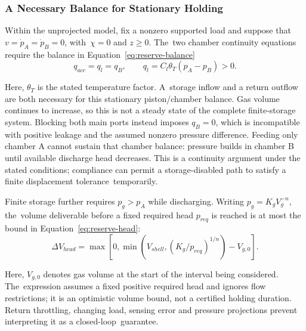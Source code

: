\documentclass[machines,article,submit,pdftex,moreauthors]{Definitions/mdpi}
\begin{document}
\subsubsection{A Necessary Balance for Stationary Holding}
Within the unprojected model, fix a nonzero supported load and suppose that $v=\dot p_A=\dot p_B=0$, with~$\chi=0$ and $z\ge0$. The~two chamber continuity equations require the balance in Equation~\eqref{eq:reserve-balance}
\begin{equation}
 q_{acc}=q_l=q_B,
 \qquad q_l=C_l\theta_T(p_A-p_B)>0.\label{eq:reserve-balance}
\end{equation}

Here, $\theta_T$ is the stated temperature factor. A~storage inflow and a return outflow are both necessary for this stationary piston/chamber balance. Gas volume continues to increase, so this is not a steady state of the complete finite-storage system. Blocking both main ports instead imposes $q_B=0$, which is incompatible with positive leakage and the assumed nonzero pressure difference. Feeding only chamber A cannot sustain that chamber balance: pressure builds in chamber B until available discharge head decreases. This is a continuity argument under the stated conditions; compliance can permit a storage-disabled path to satisfy a finite displacement tolerance~temporarily.

Finite storage further requires $p_g>p_A$ while discharging. Writing $p_g=K_g V_g^{-n}$, the~volume deliverable before a fixed required head $p_{req}$ is reached is at most the bound in Equation~\eqref{eq:reserve-head}:
\begin{equation}
 \Delta V_{head}=\max\!\left[0,\min\!\left(V_{shell},
 (K_g/p_{req})^{1/n}\right)-V_{g,0}\right].\label{eq:reserve-head}
\end{equation}

Here, $V_{g,0}$ denotes gas volume at the start of the interval being considered. The~expression assumes a fixed positive required head and ignores flow restrictions; it is an optimistic volume bound, not a certified holding duration. Return throttling, changing load, sensing error and pressure projections prevent interpreting it as a closed-loop~guarantee.
\end{document}
